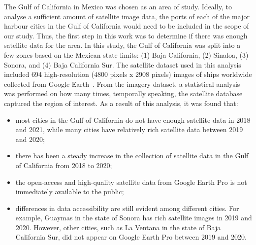 The Gulf of California in Mexico was chosen as an area of study. Ideally, to analyse a sufficient amount of satellite image data, the ports of each of the major harbour cities in the Gulf of California would need to be included in the scope of our study. Thus, the first step in this work was to determine if there was enough satellite data for the area. In this study, the Gulf of California was split into a few zones based on the Mexican state limits: (1) Baja California, (2) Sinaloa, (3) Sonora, and (4) Baja California Sur. The satellite dataset used in this analysis included 694 high-resolution (4800 pixels x 2908 pixels) images of ships worldwide collected from Google Earth~\cite{lutherborrowship}. From the imagery dataset, a statistical analysis was performed on how many times, temporally speaking, the satellite database captured the region of interest. As a result of this analysis, it was found that:
\begin{itemize}
    \item most cities in the Gulf of California do not have enough satellite data in 2018 and 2021, while many cities have relatively rich satellite data between 2019 and 2020;
    \item there has been a steady increase in the collection of satellite data in the Gulf of California from 2018 to 2020;
    \item the open-access and high-quality satellite data from Google Earth Pro is not immediately available to the public;
    \item differences in data accessibility are still evident among different cities. For example, Guaymas in the state of Sonora has rich satellite images in 2019 and 2020. However, other cities, such as La Ventana in the state of Baja California Sur, did not appear on Google Earth Pro between 2019 and 2020.
\end{itemize}

